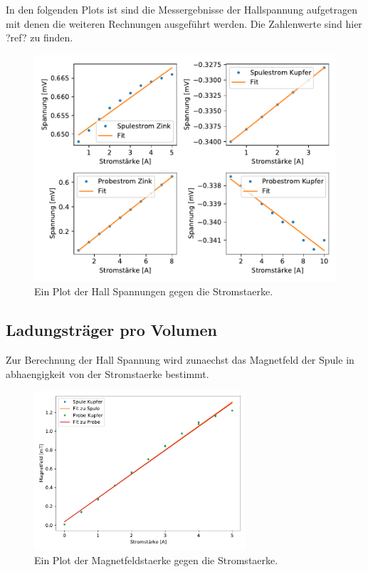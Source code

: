     In den folgenden Plots ist sind die Messergebnisse der Hallspannung aufgetragen mit denen die weiteren Rechnungen ausgeführt werden.
    Die Zahlenwerte sind hier ?ref? zu finden.

    \begin{figure}[H]
        \centering
        \includegraphics[width=1.1\textwidth]{build/Hall.pdf}
        \caption{Ein Plot der Hall Spannungen gegen die Stromstaerke.}
        \label{img:messHall}
    \end{figure}
    
     
    \subsection{Ladungsträger pro Volumen}
    

    Zur Berechnung der Hall Spannung wird zunaechst das Magnetfeld der Spule in abhaengigkeit von der Stromstaerke bestimmt.

    \begin{figure}[H]
        \centering
        \includegraphics[width=0.7\textwidth]{build/Magnetfeld.pdf}
        \caption{Ein Plot der Magnetfeldstaerke gegen die Stromstaerke.}
        \label{img:Magnetfeld}
    \end{figure}

